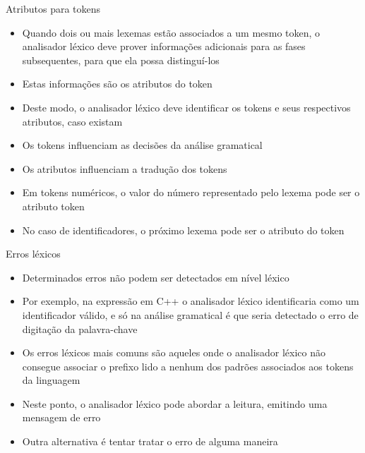 \begin{frame}[fragile]{Atributos para tokens}

    \begin{itemize}
        \item Quando dois ou mais lexemas estão associados a um mesmo token, o analisador léxico deve prover informações adicionais para as fases subsequentes,
            para que ela possa distinguí-los
        \pause

        \item Estas informações são os atributos do token
        \pause

        \item Deste modo, o analisador léxico deve identificar os tokens e seus respectivos atributos, caso existam
        \pause

        \item Os tokens influenciam as decisões da análise gramatical
        \pause

        \item Os atributos influenciam a tradução dos tokens
        \pause

        \item Em tokens numéricos, o valor do número representado pelo lexema pode ser o atributo token
        \pause

        \item No caso de identificadores, o próximo lexema pode ser o atributo do token
    \end{itemize}

\end{frame}

\begin{frame}[fragile]{Erros léxicos}

    \begin{itemize}
        \item Determinados erros não podem ser detectados em nível léxico
        \pause

        \item Por exemplo, na expressão em C++
        o analisador léxico identificaria  como um identificador válido, e só na análise gramatical é que seria detectado o erro de digitação da
        palavra-chave 
        \pause

        \item Os erros léxicos mais comuns são aqueles onde o analisador léxico não consegue associar o prefixo lido a nenhum dos padrões associados aos tokens
        da linguagem
        \pause

        \item Neste ponto, o analisador léxico pode abordar a leitura, emitindo uma mensagem de erro
        \pause

        \item Outra alternativa é tentar tratar o erro de alguma maneira
    \end{itemize}

\end{frame}


